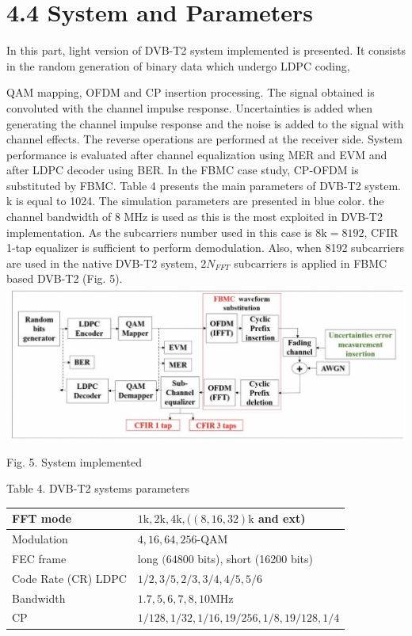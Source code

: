\documentclass[10pt]{article}
\begin{document}
\section*{4.4 System and Parameters}

In this part, light version of DVB-T2 system implemented is presented. It consists in the random generation of binary data which undergo LDPC coding,






\maketitle 
QAM mapping, OFDM and CP insertion processing. The signal obtained is convoluted with the channel impulse response. Uncertainties is added when generating the channel impulse response and the noise is added to the signal with channel effects. The reverse operations are performed at the receiver side. System performance is evaluated after channel equalization using MER and EVM and after LDPC decoder using BER. In the FBMC case study, CP-OFDM is substituted by FBMC. Table 4 presents the main parameters of DVB-T2 system. k is equal to 1024. The simulation parameters are presented in blue color. the channel bandwidth of 8 MHz is used as this is the most exploited in DVB-T2 implementation. As the subcarriers number used in this case is $8 \mathrm{k}=8192$, CFIR 1-tap equalizer is sufficient to perform demodulation. Also, when 8192 subcarriers are used in the native DVB-T2 system, $2 N_{F F T}$ subcarriers is applied in FBMC based DVB-T2 (Fig. 5).\\
\includegraphics[max width=\textwidth, center]{2024_11_15_3776bfa3c020725d7730g-1}

Fig. 5. System implemented

Table 4. DVB-T2 systems parameters

\begin{center}
\begin{tabular}{l|l}
\hline
FFT mode & $1 \mathrm{k}, 2 \mathrm{k}, 4 \mathrm{k},((8,16,32) \mathrm{k}$ and ext) \\
\hline
Modulation & $4,16,64,256$-QAM \\
\hline
FEC frame & long $(64800$ bits), short (16200 bits) \\
\hline
Code Rate (CR) LDPC & $1 / 2,3 / 5,2 / 3,3 / 4,4 / 5,5 / 6$ \\
\hline
Bandwidth & $1.7,5,6,7,8,10 \mathrm{MHz}$ \\
\hline
CP & $1 / 128,1 / 32,1 / 16,19 / 256,1 / 8,19 / 128,1 / 4$ \\
\hline
\end{tabular}
\end{center}
\end{document}
